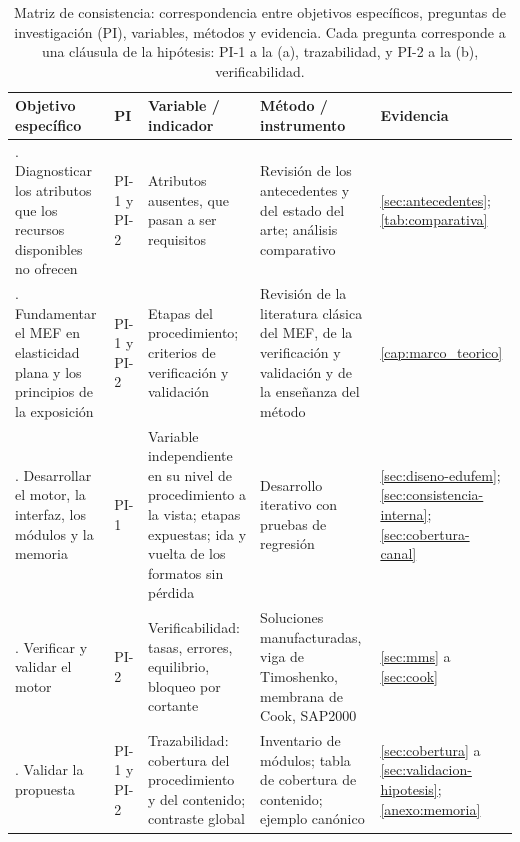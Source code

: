 \begin{table}[htbp]
\centering
\caption[Matriz de consistencia de la investigación.]{Matriz de consistencia: correspondencia entre objetivos específicos, preguntas de investigación (PI), variables, métodos y evidencia. Cada pregunta corresponde a una cláusula de la hipótesis: PI-1 a la (a), trazabilidad, y PI-2 a la (b), verificabilidad.}
\label{tab:consistencia}
{\footnotesize
\setlength{\tabcolsep}{3pt}
\renewcommand{\arraystretch}{1.15}
\begin{tabular}{@{}>{\raggedright\arraybackslash}p{3.0cm}>{\raggedright\arraybackslash}p{1.3cm}>{\raggedright\arraybackslash}p{3.0cm}>{\raggedright\arraybackslash}p{3.6cm}>{\raggedright\arraybackslash}p{2.7cm}@{}}
\toprule
\textbf{Objetivo específico} & \textbf{PI} & \textbf{Variable / indicador} & \textbf{Método / instrumento} & \textbf{Evidencia} \\
\midrule
1. Diagnosticar los atributos que los recursos disponibles no ofrecen & PI-1 y PI-2 & Atributos ausentes, que pasan a ser requisitos & Revisión de los antecedentes y del estado del arte; análisis comparativo & \autoref{sec:antecedentes}; \autoref{tab:comparativa} \\
2. Fundamentar el MEF en elasticidad plana y los principios de la exposición & PI-1 y PI-2 & Etapas del procedimiento; criterios de verificación y validación & Revisión de la literatura clásica del MEF, de la verificación y validación y de la enseñanza del método & \autoref{cap:marco_teorico} \\
3. Desarrollar el motor, la interfaz, los módulos y la memoria & PI-1 & Variable independiente en su nivel de procedimiento a la vista; etapas expuestas; ida y vuelta de los formatos sin pérdida & Desarrollo iterativo con pruebas de regresión & \autoref{sec:diseno-edufem}; \autoref{sec:consistencia-interna}; \autoref{sec:cobertura-canal} \\
4. Verificar y validar el motor & PI-2 & Verificabilidad: tasas, errores, equilibrio, bloqueo por cortante & Soluciones manufacturadas, viga de Timoshenko, membrana de Cook, SAP2000 & \autoref{sec:mms} a \autoref{sec:cook} \\
5. Validar la propuesta & PI-1 y PI-2 & Trazabilidad: cobertura del procedimiento y del contenido; contraste global & Inventario de módulos; tabla de cobertura de contenido; ejemplo canónico & \autoref{sec:cobertura} a \autoref{sec:validacion-hipotesis}; \autoref{anexo:memoria} \\
\bottomrule
\end{tabular}}
\end{table}

